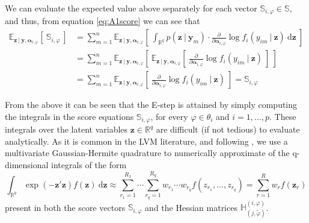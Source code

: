 \documentclass[11pt, a4paper]{article}
\newcommand{\R}{{\ensuremath{\mathbb{R}}}}
\newcommand{\cond}{\!~|~\!}
\begin{document}
We can evaluate the expected value above separately for each vector $\mathbb{S}_{i,\varphi} \in \mathbb{S}$, and thus, from equation \eqref{eq:A1score} we can see that 
\begin{align*}
\mathbb{E}_{\mathbf{z}\cond \mathbf{y},\bm{\alpha}_{i,\varphi}} \left[\!~ \mathbb{S}_{i,\varphi}\!~\right] & = \sum\limits_{m = 1}^{n} \mathbb{E}_{\mathbf{z}\cond \mathbf{y},\bm{\alpha}_{i,\varphi}} \left[\!~ \int_{\R^q} p(\mathbf{z} \cond \mathbf{y}_m) \cdot \frac{\partial}{\partial \bm{\alpha}_{i,\varphi}} \log f_i(y_{im} \cond \mathbf{z}) ~ \text{d}\mathbf{z} \!~\right] \\
& = \sum\limits_{m = 1}^{n} \mathbb{E}_{\mathbf{z}\cond \mathbf{y},\bm{\alpha}_{i,\varphi}} \left[\!~  \mathbb{E}_{\mathbf{z}\cond \mathbf{y},\bm{\alpha}_{i,\varphi}} \left[\!~  \frac{\partial}{\partial \bm{\alpha}_{i,\varphi}} \log f_i(y_{im} \cond \mathbf{z}) \!~\right] \!~\right] \\
& =  \sum\limits_{m = 1}^{n} \mathbb{E}_{\mathbf{z}\cond \mathbf{y},\bm{\alpha}_{i,\varphi}} \left[\!~  \frac{\partial}{\partial \bm{\alpha}_{i,\varphi}} \log f_i(y_{im} \cond \mathbf{z}) \!~\right] = \mathbb{S}_{i,\varphi}
\end{align*}

From the above it can be seen that the E-step is attained by simply computing the integrals in the score equations $\mathbb{S}_{i,\varphi}$, for every $\varphi \in \theta_i$ and $i = 1,...,p$. These integrals over the latent variables $\mathbf{z} \in \R^q$ are difficult (if not tedious) to evaluate analytically. As it is common in the LVM literature, and following \citet{Rizopoulos&Moustaki_BJMSP2008}, we use a multivariate Gaussian-Hermite quadrature to numerically approximate of the q-dimensional integrals of the form
\begin{equation*}
\int_{\R^q} \exp(-\mathbf{z}'\mathbf{z}) f(\mathbf{z}) ~\text{d}\mathbf{z} \approx \sum\limits_{r_1 = 1}^{R_1} \cdots \sum\limits_{r_q = 1}^{R_q} w_{r_1} \cdots w_{r_q} f(z_{r_1},...,z_{r_q}) = \sum\limits_{r = 1}^{R} w_r f(\mathbf{z}_r)
\end{equation*}
present in both the score vectors $\mathbb{S}_{i,\varphi}$ and the Hessian matrices $\mathbb{H}_{(j, \tilde{\varphi})}^{(i,\varphi)}$.
\end{document}
